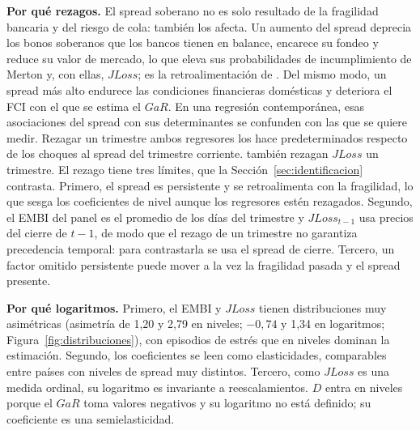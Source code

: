 \textbf{Por qué rezagos.} El spread soberano no es solo resultado de la fragilidad bancaria y del riesgo de cola: también los afecta. Un aumento del spread deprecia los bonos soberanos que los bancos tienen en balance, encarece su fondeo y reduce su valor de mercado, lo que eleva sus probabilidades de incumplimiento de Merton y, con ellas, $JLoss$; es la retroalimentación de \citet{FarhiTirole2018b}. Del mismo modo, un spread más alto endurece las condiciones financieras domésticas y deteriora el FCI con el que se estima el $GaR$. En una regresión contemporánea, esas asociaciones del spread con sus determinantes se confunden con las que se quiere medir. Rezagar un trimestre ambos regresores los hace predeterminados respecto de los choques al spread del trimestre corriente. \citet{Chari2024b} también rezagan $JLoss$ un trimestre. El rezago tiene tres límites, que la Sección~\ref{sec:identificacion} contrasta. Primero, el spread es persistente y se retroalimenta con la fragilidad, lo que sesga los coeficientes de nivel aunque los regresores estén rezagados. Segundo, el EMBI del panel es el promedio de los días del trimestre y $JLoss_{t-1}$ usa precios del cierre de $t-1$, de modo que el rezago de un trimestre no garantiza precedencia temporal: para contrastarla se usa el spread de cierre. Tercero, un factor omitido persistente puede mover a la vez la fragilidad pasada y el spread presente.

\textbf{Por qué logaritmos.} Primero, el EMBI y $JLoss$ tienen distribuciones muy asimétricas (asimetría de 1,20 y 2,79 en niveles; $-0{,}74$ y 1,34 en logaritmos; Figura~\ref{fig:distribuciones}), con episodios de estrés que en niveles dominan la estimación. Segundo, los coeficientes se leen como elasticidades, comparables entre países con niveles de spread muy distintos. Tercero, como $JLoss$ es una medida ordinal, su logaritmo es invariante a reescalamientos. $D$ entra en niveles porque el $GaR$ toma valores negativos y su logaritmo no está definido; su coeficiente es una semielasticidad.


